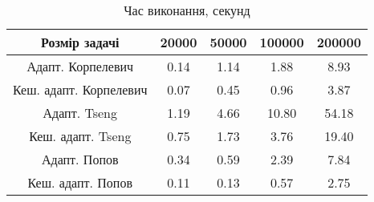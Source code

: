 \begin{table}[H]
	\centering
	\begin{tabular}{|c||c|c|c|c|}\hline
		Розмір задачі & 20000 & 50000 & 100000 & 200000 \\ \hline \hline
		Адапт. Корпелевич & 0.14 & 1.14 & 1.88 & 8.93 \\ \hline
		Кеш. адапт. Корпелевич & 0.07 & 0.45 & 0.96 & 3.87 \\ \hline
		Адапт. Tseng & 1.19 & 4.66 & 10.80 & 54.18 \\ \hline
		Кеш. адапт. Tseng & 0.75 & 1.73 & 3.76 & 19.40 \\ \hline
		Адапт. Попов & 0.34 & 0.59 & 2.39 & 7.84 \\ \hline
		Кеш. адапт. Попов & 0.11 & 0.13 & 0.57 & 2.75 \\ \hline
	\end{tabular}
	\caption{Час виконання, секунд}
\end{table}
